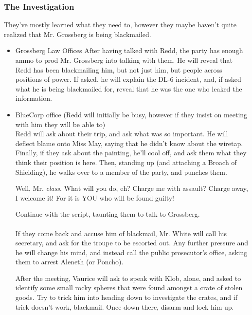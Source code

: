 \subsubsection{The Investigation}
They've mostly learned what they need to, however they maybe haven't quite realized that Mr. Grossberg is being blackmailed.

\begin{itemize}
\item Grossberg Law Offices
After having talked with Redd, the party has enough ammo to prod Mr. Grossberg into talking with them. He will reveal that Redd has been blackmailing him, but not just him, but people across positions of power. If asked, he will explain the DL-6 incident, and, if asked what he is being blackmailed for, reveal that he was the one who leaked the information.

\item BlueCorp office
(Redd will initially be busy, however if they insist on meeting with him they will be able to)\\
Redd will ask about their trip, and ask what was so important. He will deflect blame onto Miss May, saying that he didn't know about the wiretap. Finally, if they ask about the painting, he'll cool off, and ask them what they think their position is here. Then, standing up (and attaching a Broach of Shielding), he walks over to a member of the party, and punches them.
\begin{center}
Well, Mr. \emph{class}. What will you do, eh? Charge me with assault? Charge away, I welcome it! For it is YOU who will be found guilty!
\end{center}
Continue with the script, taunting them to talk to Grossberg.\\
\\
If they come back and accuse him of blackmail, Mr. White will call his secretary, and ask for the troupe to be escorted out. Any further pressure and he will change his mind, and instead call the public prosecutor's office, asking them to arrest Aleneth (or Poncho).

After the meeting, Vaurice will ask to speak with Klob, alone, and asked to identify some small rocky spheres that were found amongst a crate of stolen goods. Try to trick him into heading down to investigate the crates, and if trick doesn't work, blackmail. Once down there, disarm and lock him up.\\

\end{itemize}

